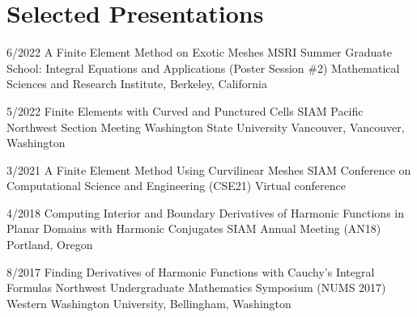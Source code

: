 \section{Selected Presentations}

\cventry
{6/2022}
{A Finite Element Method on Exotic Meshes}
{MSRI Summer Graduate School: Integral Equations and Applications (Poster Session \#2)}
{Mathematical Sciences and Research Institute, Berkeley, California}
{}
{}

\cventry
{5/2022}
{Finite Elements with Curved and Punctured Cells}
{SIAM Pacific Northwest Section Meeting}
{Washington State University Vancouver, Vancouver, Washington}
{}
{}

\cventry
{3/2021}
{A Finite Element Method Using Curvilinear Meshes}
{SIAM Conference on Computational Science and Engineering (CSE21)}
{Virtual conference}
{}
{}

\cventry
{4/2018}
{Computing Interior and Boundary Derivatives of Harmonic Functions in Planar Domains with Harmonic Conjugates}
{SIAM Annual Meeting (AN18)}
{Portland, Oregon}
{}
{}

\cventry
{8/2017}
{Finding Derivatives of Harmonic Functions with Cauchy's Integral Formulas}
{Northwest Undergraduate Mathematics Symposium (NUMS 2017)}
{Western Washington University, Bellingham, Washington}
{}
{}